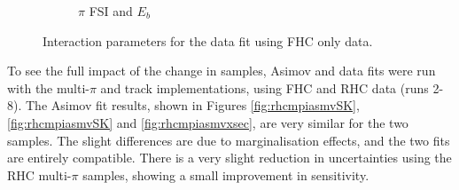 \begin{figure}[t]
\begin{subfigure}{0.49\textwidth}
  \caption{$\pi$ FSI and $E_b$}
\end{subfigure}
\caption{Interaction parameters for the data fit using FHC only data.}
\label{fig:rhcmpidat248xsec}
\end{figure}

To see the full impact of the change in samples, Asimov and data fits were run with the multi-$\pi$ and track implementations, using FHC and RHC data (runs 2-8). The Asimov fit results, shown in Figures \ref{fig:rhcmpiasmvSK}, \ref{fig:rhcmpiasmvSK} and \ref{fig:rhcmpiasmvxsec}, are very similar for the two samples. The slight differences are due to marginalisation effects, and the two fits are entirely compatible. There is a very slight reduction in uncertainties using the RHC multi-$\pi$ samples, showing a small improvement in sensitivity.

